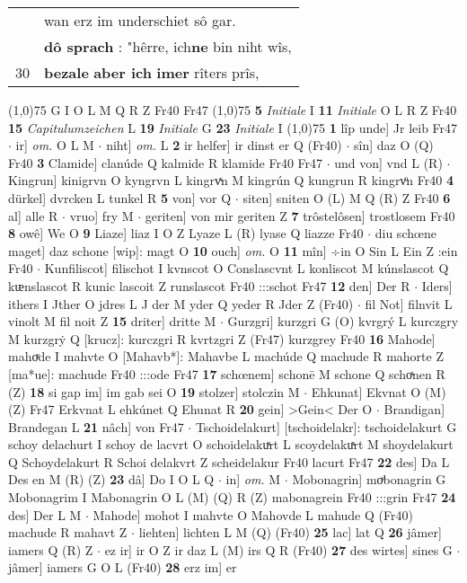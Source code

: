 \documentclass[8pt,a4paper,notitlepage]{article}
\begin{document}
\begin{table}[ht]
\begin{minipage}[t]{0.5\linewidth}
\begin{tabular}{rl}
 & wan erz im underschiet sô gar.\\ 
 & \textbf{dô sprach} : "hêrre, ich\textbf{ne} bin niht wîs,\\ 
30 & \textbf{bezale} \textbf{aber ich} \textbf{imer} rîters prîs,\\ 
\end{tabular}
\scriptsize
\line(1,0){75} \newline
G I O L M Q R Z Fr40 Fr47 \newline
\line(1,0){75} \newline
\textbf{5} \textit{Initiale} I  \textbf{11} \textit{Initiale} O L R Z Fr40  \textbf{15} \textit{Capitulumzeichen} L  \textbf{19} \textit{Initiale} G  \textbf{23} \textit{Initiale} I  \newline
\line(1,0){75} \newline
\textbf{1} lîp unde] Jr leib Fr47  $\cdot$ ir] \textit{om.} O L M  $\cdot$ niht] \textit{om.} L \textbf{2} ir helfer] ir dinst er Q (Fr40)  $\cdot$ sîn] daz O (Q) Fr40 \textbf{3} Clamide] clanúde Q kalmide R klamide Fr40 Fr47  $\cdot$ und von] vnd L (R)  $\cdot$ Kingrun] kinigrvn O kyngrvn L kingrvͯn M kingrún Q kungrun R kingrvͦn Fr40 \textbf{4} dürkel] dvrcken L tunkel R \textbf{5} von] vor Q  $\cdot$ siten] sniten O (L) M Q (R) Z Fr40 \textbf{6} al] alle R  $\cdot$ vruo] fry M  $\cdot$ geriten] von mir geriten Z \textbf{7} trôstelôsen] trostlosem Fr40 \textbf{8} owê] We O \textbf{9} Liaze] liaz I O Z Lyaze L (R) lyase Q liazze Fr40  $\cdot$ diu schœne maget] daz schone [wip]: magt O \textbf{10} ouch] \textit{om.} O \textbf{11} mîn] ÷in O Sin L Ein Z :ein Fr40  $\cdot$ Kunfiliscot] filischot I kvnscot O Conslascvnt L konliscot M kúnslascot Q kᵫnslascot R kunic lascoit Z runslascot Fr40 :::schot Fr47 \textbf{12} den] Der R  $\cdot$ Iders] ithers I Jther O jdres L J der M yder Q yeder R Jder Z (Fr40)  $\cdot$ fil Not] filnvit L vinolt M fil noit Z \textbf{15} driter] dritte M  $\cdot$ Gurzgri] kurzgri G (O) kvrgrý L kurczgry M kurzgrẏ Q [krucz]: kurczgri R kvrtzgri Z (Fr47) kurzgrey Fr40 \textbf{16} Mahode] mahoͮde I mahvte O [Mahavb*]: Mahavbe L machúde Q machude R mahorte Z [ma*ue]: machude Fr40 :::ode Fr47 \textbf{17} schœnem] schonē M schone Q schoͯnen R (Z) \textbf{18} si gap im] im gab sei O \textbf{19} stolzer] stolczin M  $\cdot$ Ehkunat] Ekvnat O (M) (Z) Fr47 Erkvnat L ehkúnet Q Ehunat R \textbf{20} gein] >Gein< Der O  $\cdot$ Brandigan] Brandegan L \textbf{21} nâch] von Fr47  $\cdot$ Tschoidelakurt] [tschoidelakr]: tschoidelakurt G schoy delachurt I schoy de lacvrt O schoidelakuͯrt L scoydelakuͯrt M shoydelakurt Q Schoydelakurt R Schoi delakvrt Z scheidelakur Fr40 lacurt Fr47 \textbf{22} des] Da L Des en M (R) (Z) \textbf{23} dâ] Do I O L Q  $\cdot$ in] \textit{om.} M  $\cdot$ Mobonagrin] moͮbonagrin G Mobonagrim I Mabonagrin O L (M) (Q) R (Z) mabonagrein Fr40 :::grin Fr47 \textbf{24} des] Der L M  $\cdot$ Mahode] mohot I mahvte O Mahovde L mahude Q (Fr40) machude R mahavt Z  $\cdot$ liehten] lichten L M (Q) (Fr40) \textbf{25} lac] lat Q \textbf{26} jâmer] iamers Q (R) Z  $\cdot$ ez ir] ir O Z ir daz L (M) irs Q R (Fr40) \textbf{27} des wirtes] sines G  $\cdot$ jâmer] iamers G O L (Fr40) \textbf{28} erz im] er 
\end{minipage}
\end{table}
\end{document}
